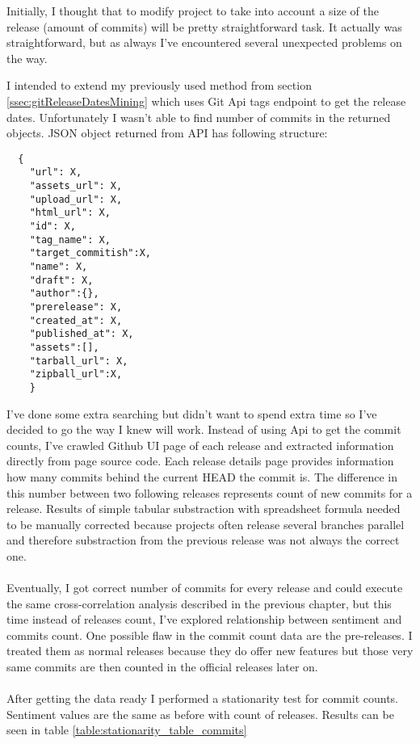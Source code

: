 Initially, I thought that to modify project to take into account a size of the release (amount of commits) will be pretty straightforward task. It actually was straightforward, but as always I've encountered several unexpected problems on the way. 

I intended to extend my previously used method from section \ref{ssec:gitReleaseDatesMining} which uses Git Api tags endpoint to get the release dates. Unfortunately I wasn't able to find number of commits in the returned objects. JSON object returned from API has following structure:

\begin{lstlisting}
  {
    "url": X,
    "assets_url": X,
    "upload_url": X,
    "html_url": X,
    "id": X,
    "tag_name": X,
    "target_commitish":X,
    "name": X,
    "draft": X,
    "author":{},
    "prerelease": X,
    "created_at": X,
    "published_at": X,
    "assets":[],
    "tarball_url": X,
    "zipball_url":X, 
    }
\end{lstlisting}

I've done some extra searching but didn't want to spend extra time so I've decided to go the way I knew will work. Instead of using Api to get the commit counts, I've crawled Github UI page of each release and extracted information directly from page source code. Each release details page provides information how many commits behind the current HEAD the commit is. The difference in this number between two following releases represents count of new commits for a release. Results of simple tabular substraction with spreadsheet formula needed to be manually corrected because projects often release several branches parallel and therefore substraction from the previous release was not always the correct one.\\
\\
Eventually, I got correct number of commits for every release and could execute the same cross-correlation analysis described in the previous chapter, but this time instead of releases count, I've explored relationship between sentiment and commits count. One possible flaw in the commit count data are the pre-releases. I treated them as normal releases because they do offer new features but those very same commits are then counted in the official releases later on.\\
\\
After getting the data ready I performed a stationarity test for commit counts. Sentiment values are the same as before with count of releases. Results can be seen in table \ref{table:stationarity_table_commits} 

